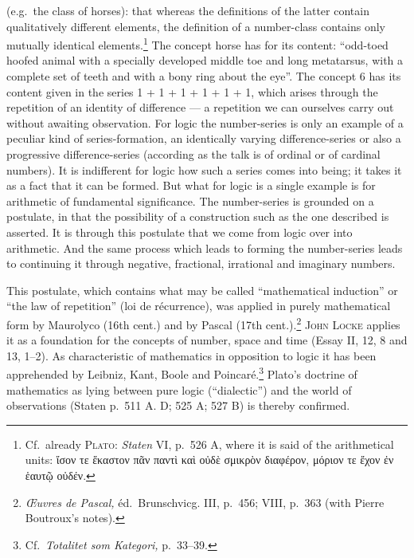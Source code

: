 \documentclass[12pt]{book}
\newcommand{\opage}[1]{\marginnote{\footnotesize\textit{[#1]}}}
\begin{document}
(e.g.\ the class of horses): that whereas the definitions of the latter contain
qualitatively different elements, the definition of a number-class contains only
mutually identical elements.\footnote{Cf.\ already \textsc{Plato:}
\textit{Staten} VI, p.\ 526 A, where it is said of the arithmetical units:
ἴσον τε ἕκαστον πᾶν παντὶ καὶ οὐδὲ σμικρὸν διαφέρον, μόριον τε ἔχον ἐν ἑαυτῷ
οὐδέν.} The concept horse has for its content: ``odd-toed hoofed animal with a
specially developed middle toe and long metatarsus, with a complete set of teeth
and with a bony ring about the eye''. The concept 6 has its content given in the
series 1 + 1 + 1 + 1 + 1 + 1, which arises through the repetition of an identity
of difference --- a repetition we can ourselves carry out without awaiting
observation. For logic the number-series is only an example of a peculiar kind of
series-formation, an identically varying difference-series or also a progressive
difference-series (according as the talk is of ordinal or of cardinal numbers).
It is indifferent for logic how such a series comes into being; it takes it as a
fact that it can be formed. But what for logic is a single example is for
arithmetic of fundamental significance. The number-series is grounded on a
postulate, in that the possibility of a construction such as the one described is
asserted. It is through this postulate that we come from logic over into
\opage{83}arithmetic. And the same process which leads to forming the number-series leads to
continuing it through negative, fractional, irrational and imaginary numbers.

This postulate, which contains what may be called ``mathematical induction'' or
``the law of repetition'' (loi de récurrence), was applied in purely mathematical
form by Maurolyco (16th cent.) and by Pascal (17th cent.).\footnote{\textit{Œuvres
de Pascal,} éd.\ Brunschvicg. III, p.\ 456; VIII, p.\ 363 (with Pierre Boutroux's
notes).} \textsc{John Locke} applies it as a foundation for the concepts of
number, space and time (Essay II, 12, 8 and 13, 1--2). As characteristic of
mathematics in opposition to logic it has been apprehended by Leibniz, Kant,
Boole and Poincaré.\footnote{Cf.\ \textit{Totalitet som Kategori,} p.\ 33--39.}
Plato's doctrine of mathematics as lying between pure logic (``dialectic'') and
the world of observations (Staten p.\ 511 A. D; 525 A; 527 B) is thereby
confirmed.
\end{document}
